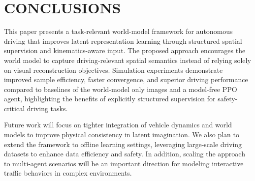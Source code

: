 \section{CONCLUSIONS}
\label{05_conclusions}

This paper presents a task-relevant world-model framework for autonomous driving that improves latent representation learning through structured spatial supervision and kinematics-aware input. The proposed approach encourages the world model to capture driving-relevant spatial semantics instead of relying solely on visual reconstruction objectives. Simulation experiments demonstrate improved sample efficiency, faster convergence, and superior driving performance compared to baselines of the world-model only images and a model-free PPO agent, highlighting the benefits of explicitly structured supervision for safety-critical driving tasks.

Future work will focus on tighter integration of vehicle dynamics and world models to improve physical consistency in latent imagination. We also plan to extend the framework to offline learning settings, leveraging large-scale driving datasets to enhance data efficiency and safety. In addition, scaling the approach to multi-agent scenarios will be an important direction for modeling interactive traffic behaviors in complex environments.